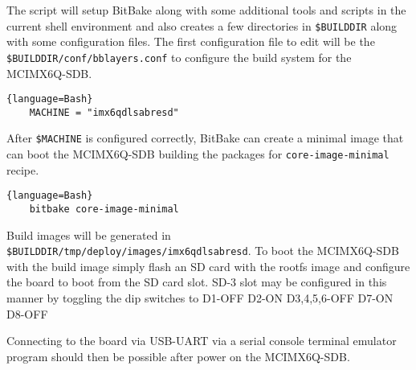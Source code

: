 The script will setup BitBake along with some additional tools and scripts in the current shell environment and also creates a few directories in \texttt{\$BUILDDIR} along with some configuration files. The first configuration file to edit will be the \texttt{\$BUILDDIR/conf/bblayers.conf} to configure the build system for the MCIMX6Q-SDB.

\begin{lstlisting}{language=Bash}
	MACHINE = "imx6qdlsabresd"
\end{lstlisting}

After \texttt{\$MACHINE} is configured correctly, BitBake can create a minimal image that can boot the MCIMX6Q-SDB building the packages for \texttt{core-image-minimal} recipe.

\begin{lstlisting}{language=Bash}
	bitbake core-image-minimal
\end{lstlisting}

Build images will be generated in \texttt{\$BUILDDIR/tmp/deploy/images/imx6qdlsabresd}. To boot the MCIMX6Q-SDB with the build image simply flash an SD card with the rootfs image and configure the board to boot from the SD card slot. SD-3 slot may be configured in this manner by toggling the dip switches to D1-OFF D2-ON D3,4,5,6-OFF D7-ON D8-OFF

Connecting to the board via USB-UART via a serial console terminal emulator program should then be possible after power on the MCIMX6Q-SDB.
